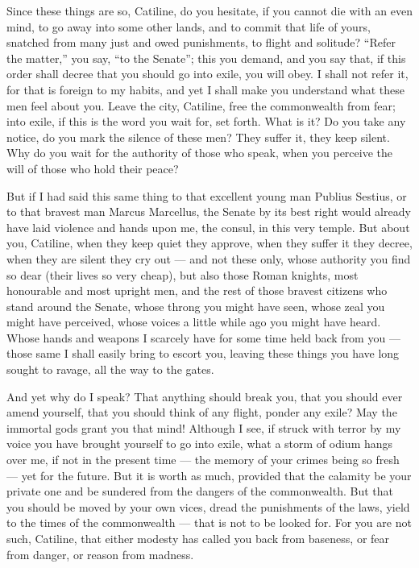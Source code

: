  Since these things are so, Catiline, do you hesitate, if you cannot die with an even mind, to go away into some other lands, and to commit that life of yours, snatched from many just and owed punishments, to flight and solitude? ``Refer the matter,'' you say, ``to the Senate''; this you demand, and you say that, if this order shall decree that you should go into exile, you will obey. I shall not refer it, for that is foreign to my habits, and yet I shall make you understand what these men feel about you. Leave the city, Catiline, free the commonwealth from fear; into exile, if this is the word you wait for, set forth. What is it? Do you take any notice, do you mark the silence of these men? They suffer it, they keep silent. Why do you wait for the authority of those who speak, when you perceive the will of those who hold their peace?

 But if I had said this same thing to that excellent young man Publius Sestius, or to that bravest man Marcus Marcellus, the Senate by its best right would already have laid violence and hands upon me, the consul, in this very temple. But about you, Catiline, when they keep quiet they approve, when they suffer it they decree, when they are silent they cry out --- and not these only, whose authority you find so dear (their lives so very cheap), but also those Roman knights, most honourable and most upright men, and the rest of those bravest citizens who stand around the Senate, whose throng you might have seen, whose zeal you might have perceived, whose voices a little while ago you might have heard. Whose hands and weapons I scarcely have for some time held back from you --- those same I shall easily bring to escort you, leaving these things you have long sought to ravage, all the way to the gates.

 And yet why do I speak? That anything should break you, that you should ever amend yourself, that you should think of any flight, ponder any exile? May the immortal gods grant you that mind! Although I see, if struck with terror by my voice you have brought yourself to go into exile, what a storm of odium hangs over me, if not in the present time --- the memory of your crimes being so fresh --- yet for the future. But it is worth as much, provided that the calamity be your private one and be sundered from the dangers of the commonwealth. But that you should be moved by your own vices, dread the punishments of the laws, yield to the times of the commonwealth --- that is not to be looked for. For you are not such, Catiline, that either modesty has called you back from baseness, or fear from danger, or reason from madness.

